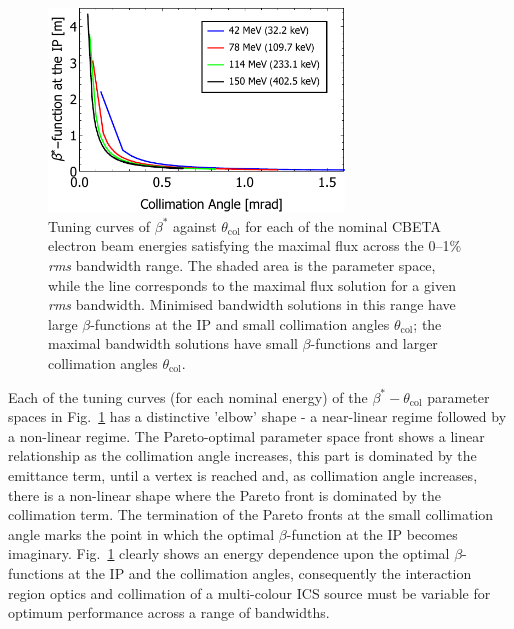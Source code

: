\documentclass[../main.tex]{subfiles}
\begin{document}
\begin{figure}[!h]
\centering
\includegraphics[width=0.7\textwidth]{Figures/CBETA_Inverse_Compton_Source_Design/CBETA_COMBINED_beta_theta.pdf}
\caption{Tuning curves of $\beta^{*}$ against $\theta_{\mathrm{col}}$ for each of the nominal CBETA electron beam energies satisfying the maximal flux across the 0--1\% \textit{rms} bandwidth range. The shaded area is the parameter space, while the line corresponds to the maximal flux solution for a given \textit{rms} bandwidth. Minimised bandwidth solutions in this range have large $\beta$-functions at the IP and small collimation angles $\theta_{\mathrm{col}}$; the maximal bandwidth solutions have small $\beta$-functions and larger collimation angles $\theta_{\mathrm{col}}$.}
\label{fig:CBETA_beta_theta_parameter_space}
\end{figure}

Each of the tuning curves (for each nominal energy) of the $\beta^{*}-\theta_{\mathrm{col}}$ parameter spaces in Fig.~\ref{fig:CBETA_beta_theta_parameter_space} has a distinctive 'elbow' shape - a near-linear regime followed by a non-linear regime. The Pareto-optimal parameter space front shows a linear relationship as the collimation angle increases, this part is dominated by the emittance term, until a vertex is reached and, as collimation angle increases, there is a non-linear shape where the Pareto front is dominated by the collimation term. The termination of the Pareto fronts at the small collimation angle marks the point in which the optimal $\beta$-function at the IP becomes imaginary. Fig.~\ref{fig:CBETA_beta_theta_parameter_space} clearly shows an energy dependence upon the optimal $\beta$-functions at the IP and the collimation angles, consequently the interaction region optics and collimation of a multi-colour ICS source must be variable for optimum performance across a range of bandwidths. 
\end{document}
